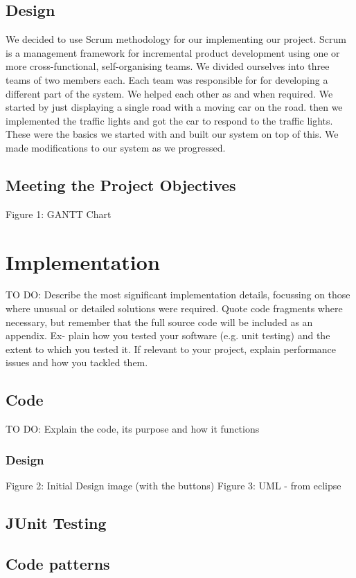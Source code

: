 \documentclass{article}
\begin{document}
		\subsection{Design}
		 We decided to use Scrum methodology for our implementing our project. Scrum is a management framework for incremental product development using one or more cross-functional, self-organising teams. 
		 We divided ourselves into three teams of two members each. Each team was responsible for for developing a different part of the system. We helped each other as and when required.
		  We started by just displaying a single road with a moving car on the road. then we implemented the traffic lights and got the car to respond to the traffic lights. These were the basics we started with and built our system on top of this. We made modifications to our system as we progressed. 	 
		 \subsection{Meeting the Project Objectives} 
		 	Figure 1: GANTT Chart
	\section{Implementation}
		TO DO: Describe the most significant implementation details, focussing on those where unusual or detailed solutions were required. Quote code fragments where necessary, but remember that the full source code will be included as an appendix. Ex- plain how you tested your software (e.g. unit testing) and the extent to which you tested it. If relevant to your project, explain performance issues and how you tackled them.
		\subsection{Code}
			TO DO: Explain the code, its purpose and how it functions
			\subsubsection{Design}
			 	Figure 2: Initial Design image (with the buttons)
				Figure 3: UML - from eclipse
		\subsection{JUnit Testing}
	 	\subsection{Code patterns}
\end{document}
